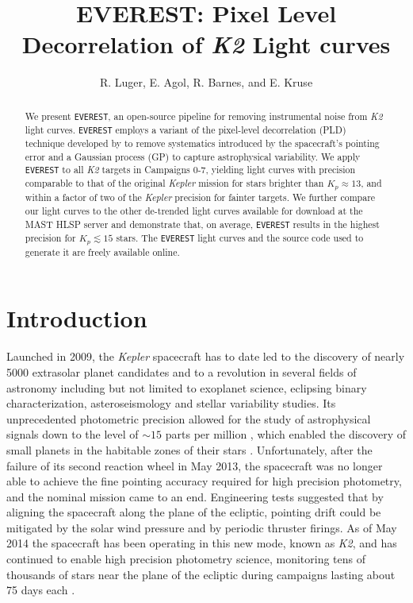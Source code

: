 \documentclass[]{emulateapj}
\begin{document}
\title{EVEREST: Pixel Level Decorrelation of \emph{K2} Light curves}

\author{R. Luger, E. Agol, R. Barnes, and E. Kruse}

\begin{abstract}
We present \texttt{EVEREST}, an open-source pipeline for removing instrumental noise
from \emph{K2} light curves. \texttt{EVEREST} employs a variant of the pixel-level decorrelation (PLD)
technique developed by \cite{DEM15} to remove systematics introduced by the spacecraft's 
pointing error and a Gaussian process (GP) to capture astrophysical variability. We
apply \texttt{EVEREST} to all \emph{K2} targets in Campaigns 0-7, yielding light curves
with precision comparable to that of the original \emph{Kepler} mission for stars brighter
than $K_p \approx 13$, and within a factor of two of the \emph{Kepler} precision for fainter
targets. We further compare our light curves to the other de-trended light curves available
for download at the MAST HLSP server and demonstrate that, on average, \texttt{EVEREST} results 
in the highest precision for $K_p \lesssim 15$ stars. The \texttt{EVEREST} light curves and the source code
used to generate it are freely available online.
\end{abstract}

\section{Introduction}
\label{sec:intro}
Launched in 2009, the \emph{Kepler} spacecraft has to date led to the discovery
of nearly 5000 extrasolar planet candidates
and to a revolution in several fields of astronomy including but not limited to
exoplanet science, eclipsing binary characterization, asteroseismology and stellar variability studies.
Its unprecedented photometric precision allowed for the study of astrophysical signals
down to the level of $\sim 15$ parts per million \citep{GIL11}, which enabled the discovery
of small planets in the habitable zones of their stars \citep[e.g.,][]{BOR13,QUI14,TOR15}.
Unfortunately, after the failure of its second reaction wheel in May 2013, the spacecraft was
no longer able to achieve the fine pointing accuracy required for high precision photometry,
and the nominal mission came to an end. Engineering tests suggested that by aligning
the spacecraft along the plane of the ecliptic, pointing drift could be mitigated
by the solar wind pressure and by periodic thruster firings. As of May 2014 the spacecraft has been operating in
this new mode, known as \emph{K2}, and has continued to enable high precision photometry
science, monitoring tens of thousands of stars near the plane of the ecliptic during campaigns 
lasting about 75 days each \citep{HOW14}.
\end{document}
